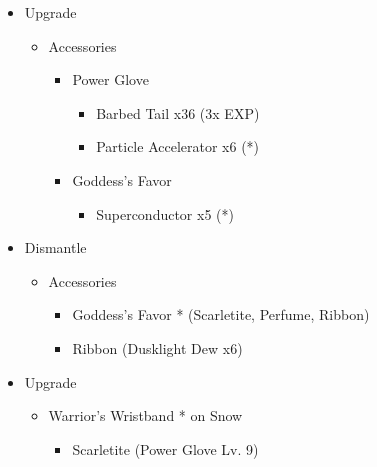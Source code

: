\begin{multicols}{2}
\begin{upgrade}
\begin{itemize}
    \item Upgrade
    \begin{itemize}
        \item Accessories
        \begin{itemize}
            \item Power Glove
            \begin{itemize}
                \item Barbed Tail x36 (3x EXP)
                \item Particle Accelerator x6 (*)
            \end{itemize}
            \item Goddess's Favor
            \begin{itemize}
                \item Superconductor x5 (*)
            \end{itemize}
        \end{itemize}
    \end{itemize}
    \item Dismantle
    \begin{itemize}
        \item Accessories
        \begin{itemize}
            \item Goddess's Favor * (Scarletite, Perfume, Ribbon)
            \item Ribbon (Dusklight Dew x6)
        \end{itemize}
    \end{itemize}
    \item Upgrade
    \begin{itemize}
        \item Warrior's Wristband * on Snow
        \begin{itemize}
            \item Scarletite (Power Glove Lv. 9)
        \end{itemize}
    \end{itemize}
\end{itemize}
\end{upgrade}
\end{multicols}
